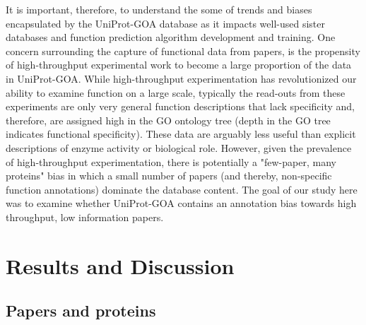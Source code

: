 \documentclass[10pt]{bmc_article}
\newenvironment{bmcformat}{\begin{raggedright}\baselineskip20pt\sloppy\setboolean{publ}{false}}{\end{raggedright}\baselineskip20pt\sloppy}
\begin{document}
\begin{bmcformat}
It is important, therefore, to understand the some of trends and biases encapsulated by the UniProt-GOA database as it impacts well-used sister databases and function prediction algorithm development and training. One concern surrounding the capture of functional data from papers, is the propensity of high-throughput experimental work to become a large proportion of the data in UniProt-GOA. While high-throughput experimentation has revolutionized our ability to examine function on a large scale, typically the read-outs from these experiments are only very general function descriptions that lack specificity and, therefore, are assigned high in the GO ontology tree (depth in the GO tree indicates functional specificity). These data are arguably less useful than explicit descriptions of enzyme activity or biological role. However, given the prevalence of high-throughput experimentation, there is potentially a "few-paper, many proteins" bias in which a small number of papers (and thereby, non-specific function annotations) dominate the database content. The goal of our study here was to examine whether UniProt-GOA contains an annotation bias towards high throughput, low information papers. 

 
\section*{Results and Discussion}
  \subsection*{Papers and proteins}


\end{bmcformat}
\end{document}
